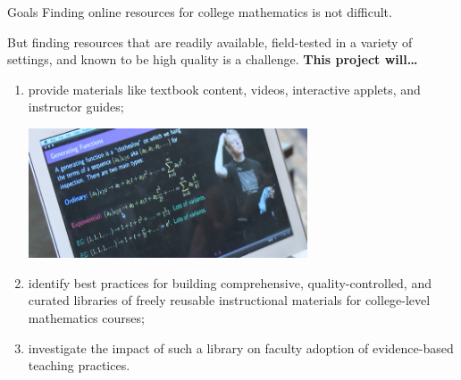 \begin{sectionblock}{Goals}
  Finding online resources for college
  mathematics is not difficult.

  \vspace{1ex}
  But finding resources that are readily available, field-tested in a
  variety of settings, and known to be high quality is a
  challenge. \textbf{This project will\ldots}
  \begin{enumerate}
  \item provide materials like textbook
    content, videos, interactive applets, and instructor guides;\\[1ex]
    \begin{center}
      \includegraphics[width=0.65\textwidth]{tom.png}
    \end{center}
  \item identify best practices for building comprehensive,
    quality-controlled, and curated libraries of freely reusable
    instructional materials for college-level mathematics courses;
  \item investigate the impact of such a library on faculty adoption of
    evidence-based teaching practices.
  \end{enumerate}
\end{sectionblock}


